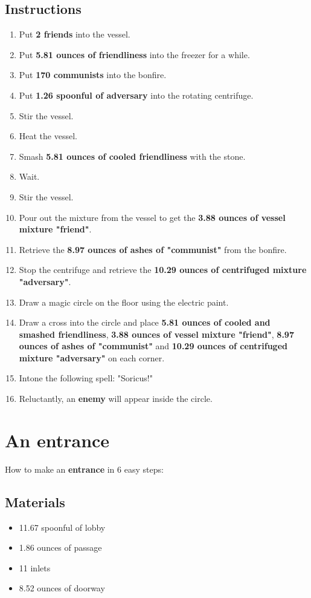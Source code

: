 \documentclass{article}
\begin{document}
\subsection{Instructions}\begin{enumerate}
\item 
Put \textbf{2 friends} into the vessel.
\item 
Put \textbf{5.81 ounces of friendliness} into the freezer for a while.
\item 
Put \textbf{170 communists} into the bonfire.
\item 
Put \textbf{1.26 spoonful of adversary} into the rotating centrifuge.
\item 
Stir the vessel.
\item 
Heat the vessel.
\item 
Smash \textbf{5.81 ounces of cooled friendliness} with the stone.
\item 
Wait.
\item 
Stir the vessel.
\item 
Pour out the mixture from the vessel to get the \textbf{3.88 ounces of vessel mixture "friend"}.
\item 
Retrieve the \textbf{8.97 ounces of ashes of "communist"} from the bonfire.
\item 
Stop the centrifuge and retrieve the \textbf{10.29 ounces of centrifuged mixture "adversary"}.
\item 
Draw a magic circle on the floor using the electric paint.
\item 
Draw a cross into the circle and place \textbf{5.81 ounces of cooled and smashed friendliness}, \textbf{3.88 ounces of vessel mixture "friend"}, \textbf{8.97 ounces of ashes of "communist"} and \textbf{10.29 ounces of centrifuged mixture "adversary"} on each corner.
\item 
Intone the following spell: "Soricus!"
\item 
Reluctantly, an \textbf{enemy} will appear inside the circle.
\end{enumerate}
\newpage
\section{An entrance}How to make an \textbf{entrance} in 6 easy steps:

\subsection{Materials}\begin{itemize}
\item 
11.67 spoonful of lobby
\item 
1.86 ounces of passage
\item 
11 inlets
\item 
8.52 ounces of doorway
\end{itemize}
\end{document}
